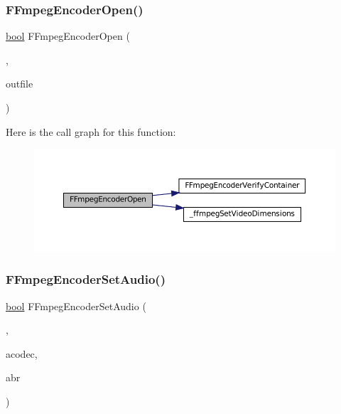 \subsubsection{\texorpdfstring{F\+Fmpeg\+Encoder\+Open()}{FFmpegEncoderOpen()}}
{\footnotesize\ttfamily \mbox{\hyperlink{libretro_8h_a4a26dcae73fb7e1528214a068aca317e}{bool}} F\+Fmpeg\+Encoder\+Open (\begin{DoxyParamCaption}\item[{struct \mbox{\hyperlink{ffmpeg-encoder_8h_struct_f_fmpeg_encoder}{F\+Fmpeg\+Encoder}} $\ast$}]{,  }\item[{const char $\ast$}]{outfile }\end{DoxyParamCaption})}

Here is the call graph for this function\+:
\nopagebreak
\begin{figure}[H]
\begin{center}
\leavevmode
\includegraphics[width=350pt]{ffmpeg-encoder_8h_a0299d242cf2dc28fcf17994c46b72faf_cgraph}
\end{center}
\end{figure}
\mbox{\label{ffmpeg-encoder_8h_ae3fa582320c53317a31597aba10d7356}} 
\subsubsection{\texorpdfstring{F\+Fmpeg\+Encoder\+Set\+Audio()}{FFmpegEncoderSetAudio()}}
{\footnotesize\ttfamily \mbox{\hyperlink{libretro_8h_a4a26dcae73fb7e1528214a068aca317e}{bool}} F\+Fmpeg\+Encoder\+Set\+Audio (\begin{DoxyParamCaption}\item[{struct \mbox{\hyperlink{ffmpeg-encoder_8h_struct_f_fmpeg_encoder}{F\+Fmpeg\+Encoder}} $\ast$}]{,  }\item[{const char $\ast$}]{acodec,  }\item[{unsigned}]{abr }\end{DoxyParamCaption})}

